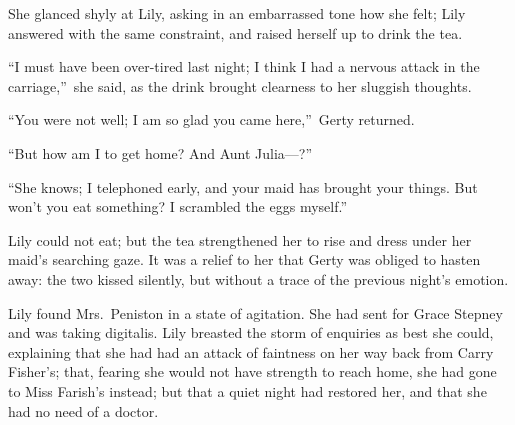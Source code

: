 \documentclass[12pt,a4paper]{book}
\begin{document}
She glanced shyly at Lily, asking in an embarrassed tone how she
felt; Lily answered with the same constraint, and raised herself
up to drink the tea.





``I must have been over-tired last night; I think I had a
nervous attack in the carriage,''\ she said, as the drink brought
clearness to her sluggish thoughts.





``You were not well; I am so glad you came here,''\ Gerty returned.





``But how am I to get home? And Aunt Julia---?''





``She knows; I telephoned early, and your maid has brought your
things. But won't you eat something? I scrambled the eggs
myself.''





Lily could not eat; but the tea strengthened her to rise and
dress under her maid's searching gaze. It was a relief to her
that Gerty was obliged to hasten away: the two kissed silently,
but without a trace of the previous night's emotion.





Lily found Mrs.\ Peniston in a state of agitation. She had sent
for Grace Stepney and was taking digitalis. Lily breasted the
storm of enquiries as best she could, explaining that she had had
an attack of faintness on her way back from Carry Fisher's; that,
fearing she would not have strength to reach home, she had gone
to Miss Farish's instead; but that a quiet night had restored
her, and that she had no need of a doctor.
\end{document}
